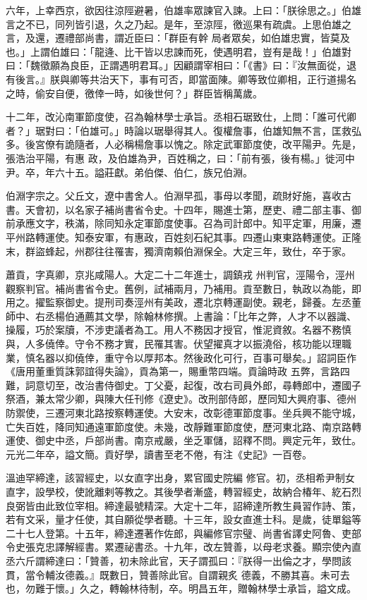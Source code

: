 \begin{pinyinscope}
 六年，上幸西京，欲因往涼陘避暑，伯雄率眾諫官入諫。上曰：「朕徐思之。」伯雄言之不已，同列皆引退，久之乃起。是年，至涼陘，徼巡果有疏虞。上思伯雄之言，及還，遷禮部尚書，謂近臣曰：「群臣有幹
 局者眾矣，如伯雄忠實，皆莫及也。」上謂伯雄曰：「龍逄、比干皆以忠諫而死，使遇明君，豈有是哉！」伯雄對曰：「魏徵願為良臣，正謂遇明君耳。」因顧謂宰相曰：「《書》曰：『汝無面從，退有後言。』朕與卿等共治天下，事有可否，即當面陳。卿等致位卿相，正行道揚名之時，偷安自便，徼倖一時，如後世何？」群臣皆稱萬歲。



 十二年，改沁南軍節度使，召為翰林學士承旨。丞相石琚致仕，上問：「誰可代卿者？」琚對曰：「伯雄可。」時論以琚舉得其人。復權詹事，伯雄知無不言，匡救弘多。後宮僚有詭隨者，人必稱楊詹事以愧之。除定武軍節度使，改平陽尹。先是，張浩治平陽，有惠
 政，及伯雄為尹，百姓稱之，曰：「前有張，後有楊。」徙河中尹。卒，年六十五。謚莊獻。弟伯傑、伯仁，族兄伯淵。



 伯淵字宗之。父丘文，遼中書舍人。伯淵早孤，事母以孝聞，疏財好施，喜收古書。天會初，以名家子補尚書省令史。十四年，賜進士第，歷吏、禮二部主事、御前承應文字，秩滿，除同知永定軍節度使事。召為司計郎中。知平定軍，用廉，遷平州路轉運使。知泰安軍，有惠政，百姓刻石紀其事。四遷山東東路轉運使。正隆末，群盜蜂起，州郡往往罹害，獨濟南賴伯淵保全。大定三年，致仕，卒于家。



 蕭貢，字真卿，京兆咸陽人。大定二十二年進士，調鎮戎
 州判官，涇陽令，涇州觀察判官。補尚書省令史。舊例，試補兩月，乃補用。貢至數日，執政以為能，即用之。擢監察御史。提刑司奏涇州有美政，遷北京轉運副使。親老，歸養。左丞董師中、右丞楊伯通薦其文學，除翰林修撰。上書論：「比年之弊，人才不以器識、操履，巧於案牘，不涉吏議者為工。用人不務因才授官，惟泥資敘。名器不務慎與，人多僥倖。守令不務才實，民罹其害。伏望擢真才以振澆俗，核功能以理職業，慎名器以抑僥倖，重守令以厚邦本。然後政化可行，百事可舉矣。」詔詞臣作《唐用董重質誅郭誼得失論》，貢為第一，賜重幣四端。貢論時政
 五弊，言路四難，詞意切至，改治書侍御史。丁父憂，起復，改右司員外郎，尋轉郎中，遷國子祭酒，兼太常少卿，與陳大任刊修《遼史》。改刑部侍郎，歷同知大興府事、德州防禦使，三遷河東北路按察轉運使。大安末，改彰德軍節度事。坐兵興不能守城，亡失百姓，降同知通遠軍節度使。未幾，改靜難軍節度使，歷河東北路、南京路轉運使、御史中丞，戶部尚書。南京戒嚴，坐乏軍儲，詔釋不問。興定元年，致仕。元光二年卒，謚文簡。貢好學，讀書至老不倦，有注《史記》一百卷。



 溫迪罕締達，該習經史，以女直字出身，累官國史院編
 修官。初，丞相希尹制女直字，設學校，使訛離剌等教之。其後學者漸盛，轉習經史，故納合椿年、紇石烈良弼皆由此致位宰相。締達最號精深。大定十二年，詔締達所教生員習作詩、策，若有文采，量才任使，其自願從學者聽。十三年，設女直進士科。是歲，徒單鎰等二十七人登第。十五年，締達遷著作佐郎，與編修官宗璧、尚書省譯史阿魯、吏部令史張克忠譯解經書。累遷祕書丞。十九年，改左贊善，以母老求養。顯宗使內直丞六斤謂締達曰：「贊善，初未除此官，天子謂孤曰：『朕得一出倫之才，學問該貫，當令輔汝德義。』既數日，贊善除此官。自謂親炙
 德義，不勝其喜。未可去也，勿難于懷。」久之，轉翰林待制，卒。明昌五年，贈翰林學士承旨，謚文成。




\end{pinyinscope}
